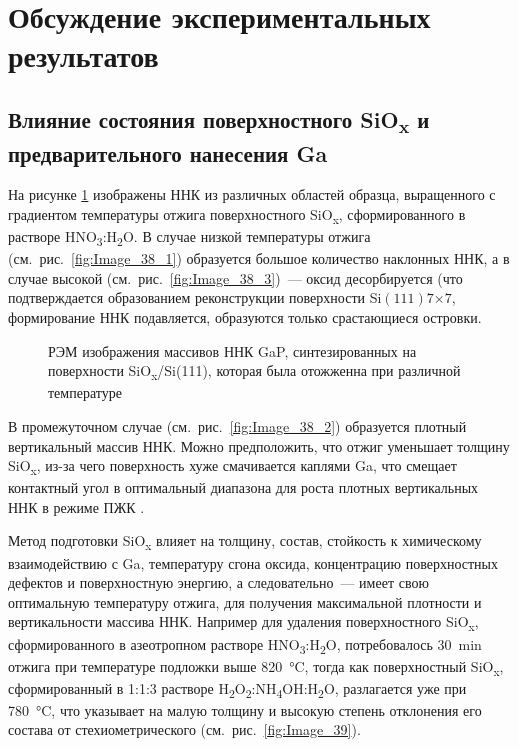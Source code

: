 \section{Обсуждение экспериментальных результатов}\label{sec:ch6/sec2}

\subsection{Влияние состояния поверхностного SiO\textsubscript{x} и предварительного нанесения Ga}\label{subsec:ch6/sec2/sub1}

На рисунке \cref{fig:Image_38} изображены ННК из различных областей образца, выращенного с градиентом температуры отжига поверхностного SiO\textsubscript{x}, сформированного в растворе HNO\textsubscript{3}:H\textsubscript{2}O. В случае низкой температуры отжига (см.~рис.~\cref{fig:Image_38_1}) образуется большое количество наклонных ННК, а в случае высокой (см.~рис.~\cref{fig:Image_38_3})~--- оксид десорбируется (что подтверждается образованием реконструкции поверхности Si\((111)7\)\(\times\)\(7\), формирование ННК подавляется, образуются только срастающиеся островки.

\begin{figure}[ht]
	\caption{РЭМ изображения массивов ННК GaP, синтезированных на поверхности SiO\textsubscript{x}/Si(111), которая была отожженна при различной температуре}\label{fig:Image_38}
\end{figure}

В промежуточном случае (см.~рис.~\cref{fig:Image_38_2}) образуется плотный вертикальный массив ННК. Можно предположить, что отжиг уменьшает толщину SiO\textsubscript{x}, из-за чего поверхность хуже смачивается каплями Ga, что смещает контактный угол в оптимальный диапазона для роста плотных вертикальных ННК в режиме ПЖК \cite{Matteini2015}.

Метод подготовки SiO\textsubscript{x} влияет на толщину, состав, стойкость к химическому взаимодействию с Ga, температуру сгона оксида, концентрацию поверхностных дефектов и поверхностную энергию, а следовательно~--- имеет свою оптимальную температуру отжига, для получения максимальной плотности и вертикальности массива ННК. Например для удаления поверхностного SiO\textsubscript{x}, сформированного в азеотропном растворе HNO\textsubscript{3}:H\textsubscript{2}O, потребовалось 30~\si{\minute} отжига при температуре подложки выше 820~\si{\degreeCelsius}, тогда как поверхностный SiO\textsubscript{x}, сформированный в 1:1:3 растворе H\textsubscript{2}O\textsubscript{2}:NH\textsubscript{4}OH:H\textsubscript{2}O, разлагается уже при 780~\si{\degreeCelsius}, что указывает на малую толщину и высокую степень отклонения его состава от стехиометрического (см.~рис.~\cref{fig:Image_39}).

